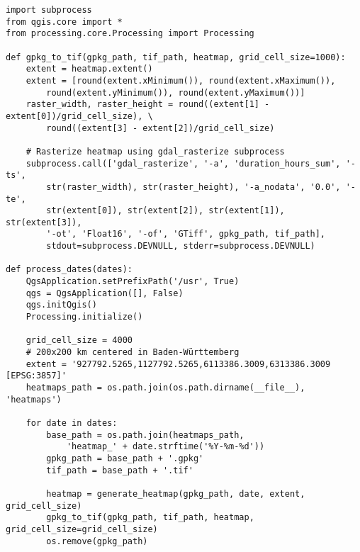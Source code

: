 \clearpage
\begin{code}
\begin{verbatim}
import subprocess
from qgis.core import *
from processing.core.Processing import Processing

def gpkg_to_tif(gpkg_path, tif_path, heatmap, grid_cell_size=1000):
    extent = heatmap.extent()
    extent = [round(extent.xMinimum()), round(extent.xMaximum()),
        round(extent.yMinimum()), round(extent.yMaximum())]
    raster_width, raster_height = round((extent[1] - extent[0])/grid_cell_size), \
        round((extent[3] - extent[2])/grid_cell_size)

    # Rasterize heatmap using gdal_rasterize subprocess
    subprocess.call(['gdal_rasterize', '-a', 'duration_hours_sum', '-ts',
        str(raster_width), str(raster_height), '-a_nodata', '0.0', '-te',
        str(extent[0]), str(extent[2]), str(extent[1]), str(extent[3]),
        '-ot', 'Float16', '-of', 'GTiff', gpkg_path, tif_path],
        stdout=subprocess.DEVNULL, stderr=subprocess.DEVNULL)

def process_dates(dates):
    QgsApplication.setPrefixPath('/usr', True)
    qgs = QgsApplication([], False)
    qgs.initQgis()
    Processing.initialize()

    grid_cell_size = 4000
    # 200x200 km centered in Baden-Württemberg
    extent = '927792.5265,1127792.5265,6113386.3009,6313386.3009 [EPSG:3857]'
    heatmaps_path = os.path.join(os.path.dirname(__file__), 'heatmaps')

    for date in dates:
        base_path = os.path.join(heatmaps_path,
            'heatmap_' + date.strftime('%Y-%m-%d'))
        gpkg_path = base_path + '.gpkg'
        tif_path = base_path + '.tif'

        heatmap = generate_heatmap(gpkg_path, date, extent, grid_cell_size)
        gpkg_to_tif(gpkg_path, tif_path, heatmap, grid_cell_size=grid_cell_size)
        os.remove(gpkg_path)
\end{verbatim}
\label{lst:ProcessDatesFunction}
\end{code}

